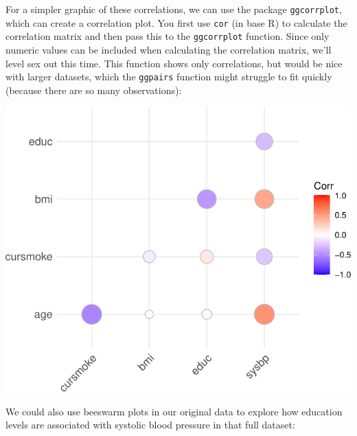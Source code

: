 \documentclass[
]{book}
\newenvironment{Shaded}{\begin{snugshade}}{\end{snugshade}}
\newcommand{\DataTypeTok}[1]{\textcolor[rgb]{0.13,0.29,0.53}{#1}}
\newcommand{\KeywordTok}[1]{\textcolor[rgb]{0.13,0.29,0.53}{\textbf{#1}}}
\newcommand{\NormalTok}[1]{#1}
\newcommand{\OperatorTok}[1]{\textcolor[rgb]{0.81,0.36,0.00}{\textbf{#1}}}
\newcommand{\StringTok}[1]{\textcolor[rgb]{0.31,0.60,0.02}{#1}}
\begin{document}
For a simpler graphic of these correlations, we can use the package
\texttt{ggcorrplot}, which can create a correlation plot. You first use \texttt{cor} (in base
R) to calculate the correlation matrix and then pass this to the \texttt{ggcorrplot}
function. Since only numeric values can be included when calculating the
correlation matrix, we'll level sex out this time. This function shows only
correlations, but would be nice with larger datasets, which the \texttt{ggpairs}
function might struggle to fit quickly (because there are so many observations):

\begin{Shaded}
\end{Shaded}

\includegraphics{adv_epi_analysis_files/figure-latex/unnamed-chunk-286-1.pdf}

We could also use beeswarm plots in our original data to explore how
education levels are associated with systolic blood pressure in that full
dataset:
\end{document}
